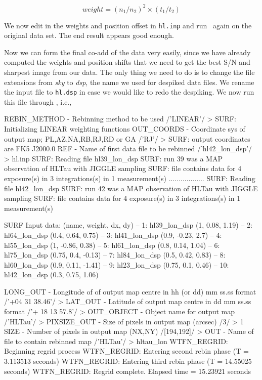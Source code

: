 \documentclass[twoside,11pt,noabs]{starlink}
\providecommand{\task}[1]{\textsf{#1}}
\providecommand{\rebin}{\xref{\task{rebin}}{sun216}{REBIN}}
\providecommand{\desp}{\xref{\task{despike}}{sun216}{DESPIKE}}
\begin{document}
\begin{equation} weight = (n_1/n_2)^2\times(t_1/t_2) \end{equation}

\noindent
We now edit in the weights and position offset in \texttt{hl.inp} and
run \desp\ again on the original data set.  The end result appears
good enough.

Now we can form the final co-add of the data very easily, since we
have already computed the weights and position shifts that we need to
get the best S/N and sharpest image from our data.  The only thing we
need to do is to change the file extensions from \textit{sky} to \textit{dsp}, the name we used for despiked data files.  We rename the input
file to \texttt{hl.dsp} in case we would like to redo the despiking.
We now run this file through \rebin, i.e.,

\begin{small}
\begin{terminalv}
REBIN_METHOD - Rebinning method to be used /'LINEAR'/ >
SURF: Initializing LINEAR weighting functions
OUT_COORDS - Coordinate sys of output map; PL,AZ,NA,RB,RJ,RD or GA
/'RJ'/ >
SURF: output coordinates are FK5 J2000.0
REF - Name of first data file to be rebinned /'hl42_lon_dsp'/ >
hl.inp
SURF: Reading file hl39_lon_dsp
SURF: run 39 was a MAP observation of HLTau with JIGGLE sampling
SURF: file contains data for 4 exposure(s) in 3 integrations(s) in 1
measurement(s)
..................
SURF: Reading file hl42_lon_dsp
SURF: run 42 was a MAP observation of HLTau with JIGGLE sampling
SURF: file contains data for 4 exposure(s) in 3 integrations(s) in 1
measurement(s)

SURF Input data: (name, weight, dx, dy)
   -- 1: hl39_lon_dsp (1, 0.08, 1.19)
   -- 2: hl64_lon_dsp (0.4, 0.64, 0.75)
   -- 3: hl41_lon_dsp (0.9, -0.23, 2.7)
   -- 4: hl55_lon_dsp (1, -0.86, 0.38)
   -- 5: hl61_lon_dsp (0.8, 0.14, 1.04)
   -- 6: hl75_lon_dsp (0.75, 0.4, -0.13)
   -- 7: hl84_lon_dsp (0.5, 0.42, 0.83)
   -- 8: hl60_lon_dsp (0.9, 0.11, -1.41)
   -- 9: hl23_lon_dsp (0.75, 0.1, 0.46)
   -- 10: hl42_lon_dsp (0.3, 0.75, 1.06)

LONG_OUT - Longitude of of output map centre in hh (or dd) mm ss.ss
format
/'+04 31 38.46'/ >
LAT_OUT - Latitude of output map centre in dd mm ss.ss format
/'+ 18 13 57.8'/ >
OUT_OBJECT - Object name for output map /'HLTau'/ >
PIXSIZE_OUT - Size of pixels in output map (arcsec) /3/ > 1
SIZE - Number of pixels in output map (NX,NY) /[194,192]/ >
OUT - Name of file to contain rebinned map /'HLTau'/ > hltau_lon
WTFN_REGRID: Beginning regrid process
WTFN_REGRID: Entering second rebin phase (T = 3.113513 seconds)
WTFN_REGRID: Entering third rebin phase (T = 14.55025 seconds)
WTFN_REGRID: Regrid complete. Elapsed time = 15.23921 seconds
\end{terminalv}
\end{small}
\end{document}
